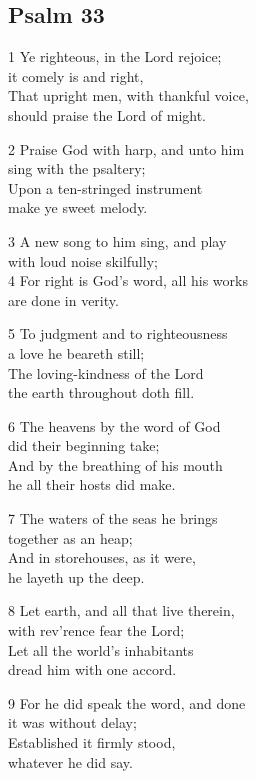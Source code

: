 \subsection*{Psalm 33 }

1 Ye righteous, in the Lord rejoice;\\
it comely is and right,\\
That upright men, with thankful voice,\\
should praise the Lord of might.

2 Praise God with harp, and unto him\\
sing with the psaltery;\\
Upon a ten-stringed instrument\\
make ye sweet melody.

3 A new song to him sing, and play\\
with loud noise skilfully;\\
4 For right is God’s word, all his works\\
are done in verity.

5 To judgment and to righteousness\\
a love he beareth still;\\
The loving-kindness of the Lord\\
the earth throughout doth fill.

6 The heavens by the word of God\\
did their beginning take;\\
And by the breathing of his mouth\\
he all their hosts did make.

7 The waters of the seas he brings\\
together as an heap;\\
And in storehouses, as it were,\\
he layeth up the deep.

8 Let earth, and all that live therein,\\
with rev’rence fear the Lord;\\
Let all the world’s inhabitants\\
dread him with one accord.

9 For he did speak the word, and done\\
it was without delay;\\
Established it firmly stood,\\
whatever he did say.

